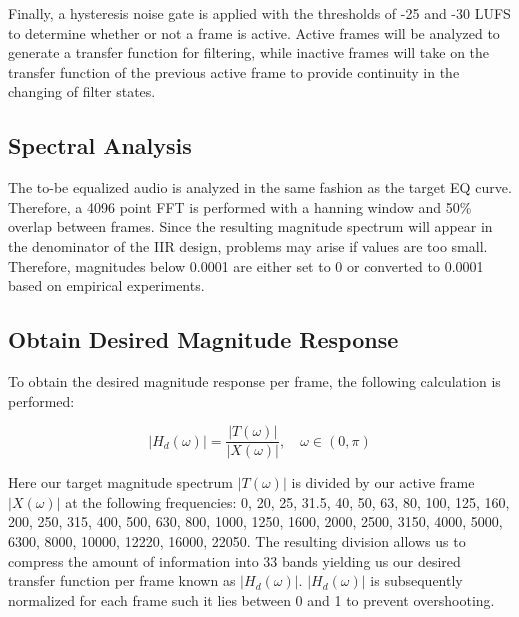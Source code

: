 \documentclass{article}
\begin{document}
Finally, a hysteresis noise gate is applied with the thresholds of -25 and -30 LUFS to determine whether or not a frame is active.  Active frames will be analyzed to generate a transfer function for filtering, while inactive frames will take on the transfer function of the previous active frame to provide continuity in the changing of filter states.

\subsection{Spectral Analysis}
\label{subsec:Spectral Analysis}

The to-be equalized audio is analyzed in the same fashion as the target EQ curve.  Therefore, a 4096 point FFT is performed with a hanning window and 50\% overlap between frames.  Since the resulting magnitude spectrum will appear in the denominator of the IIR design, problems may arise if values are too small.  Therefore, magnitudes below 0.0001 are either set to 0 or converted to 0.0001 based on empirical experiments.

\subsection{Obtain Desired Magnitude Response}
\label{subsec:Obtain Desired Magnitude Response}

To obtain the desired magnitude response per frame, the following calculation is performed:

\begin{equation}
\label{eq:targetmag}
|H_d(\omega)| = \frac{|T(\omega)|}{|X(\omega)|}, \quad \omega \in (0,\pi)
\end{equation}

Here our target magnitude spectrum $|T(\omega)|$ is divided by our active frame $|X(\omega)|$ at the following frequencies: 0, 20, 25, 31.5, 40, 50, 63, 80, 100, 125, 160, 200, 250, 315, 400, 500, 630, 800, 1000, 1250, 1600, 2000, 2500, 3150, 4000, 5000, 6300, 8000, 10000, 12220, 16000, 22050.  The resulting division allows us to compress the amount of information into 33 bands yielding us our desired transfer function per frame known as $|H_d(\omega)|$.  $|H_d(\omega)|$ is subsequently normalized for each frame such it lies between 0 and 1 to prevent overshooting.
\end{document}
